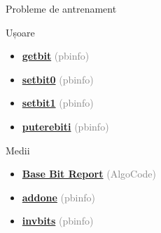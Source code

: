 \documentclass{beamer}
\begin{document}
\begin{frame}{Probleme de antrenament}
  \begin{block}{Ușoare}
    \begin{itemize}
      \item \href{https://www.pbinfo.ro/probleme/2577/getbit}{\textbf{getbit}} {\footnotesize\textcolor{gray}{(pbinfo)}}
      \item \href{https://www.pbinfo.ro/probleme/2580/setbit0}{\textbf{setbit0}} {\footnotesize\textcolor{gray}{(pbinfo)}}
      \item \href{https://www.pbinfo.ro/probleme/2581/setbit1}{\textbf{setbit1}} {\footnotesize\textcolor{gray}{(pbinfo)}}
      \item \href{https://www.pbinfo.ro/probleme/2711/puterebiti}{\textbf{puterebiti}} {\footnotesize\textcolor{gray}{(pbinfo)}}
    \end{itemize}
  \end{block}
  \begin{block}{Medii}
    \begin{itemize}
      \item \href{https://code.algolymp.com/problems/4271}{\textbf{Base Bit Report}} {\footnotesize\textcolor{gray}{(AlgoCode)}}
      \item \href{https://www.pbinfo.ro/probleme/2799/addone}{\textbf{addone}} {\footnotesize\textcolor{gray}{(pbinfo)}}
      \item \href{https://www.pbinfo.ro/probleme/2624/invbits}{\textbf{invbits}} {\footnotesize\textcolor{gray}{(pbinfo)}}
    \end{itemize}
  \end{block}
\end{frame}
\end{document}
